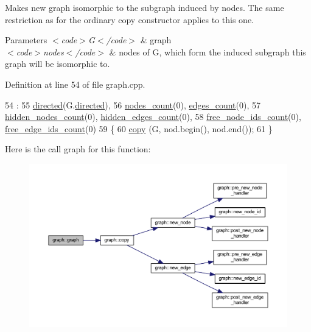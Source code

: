 Makes new graph isomorphic to the subgraph induced by {\ttfamily nodes}. The same restriction as for the ordinary copy constructor applies to this one.


\begin{DoxyParams}{Parameters}
{\em $<$code$>$\+G$<$/code$>$} & graph \\
\hline
{\em $<$code$>$nodes$<$/code$>$} & nodes of {\ttfamily G}, which form the induced subgraph this graph will be isomorphic to. \\
\hline
\end{DoxyParams}


Definition at line 54 of file graph.\+cpp.


\begin{DoxyCode}
54                                                :
55     \mbox{\hyperlink{classgraph_ab4120df210eb3d03d20b0bd27f8cbe8c}{directed}}(G.\mbox{\hyperlink{classgraph_ab4120df210eb3d03d20b0bd27f8cbe8c}{directed}}),
56     \mbox{\hyperlink{classgraph_a1f59223d0bcf647920963d7a661dd74a}{nodes\_count}}(0), \mbox{\hyperlink{classgraph_af560ff4263ad165c166a46084e781b4a}{edges\_count}}(0),
57     \mbox{\hyperlink{classgraph_aa72548d972d226a69f7f8fb92b363860}{hidden\_nodes\_count}}(0), \mbox{\hyperlink{classgraph_a3151f544e049fbd985204ca9d8f74c97}{hidden\_edges\_count}}(0),
58     \mbox{\hyperlink{classgraph_a9480e2310fe64c3a8ad295bb3f119772}{free\_node\_ids\_count}}(0), \mbox{\hyperlink{classgraph_a336be547b5e0ca43b96cf00131e0e1da}{free\_edge\_ids\_count}}(0)
59 \{
60     \mbox{\hyperlink{classgraph_abc39d65a6ca3f3165bc71c7125dfd22e}{copy}} (G, nod.begin(), nod.end());
61 \}
\end{DoxyCode}
Here is the call graph for this function\+:\nopagebreak
\begin{figure}[H]
\begin{center}
\leavevmode
\includegraphics[width=350pt]{classgraph_a05af875b45eb2534f06a42dd1a6783c6_cgraph}
\end{center}
\end{figure}
\mbox{\label{classgraph_ae4659f3efed5c60e85a19136f8f80a63}} 
